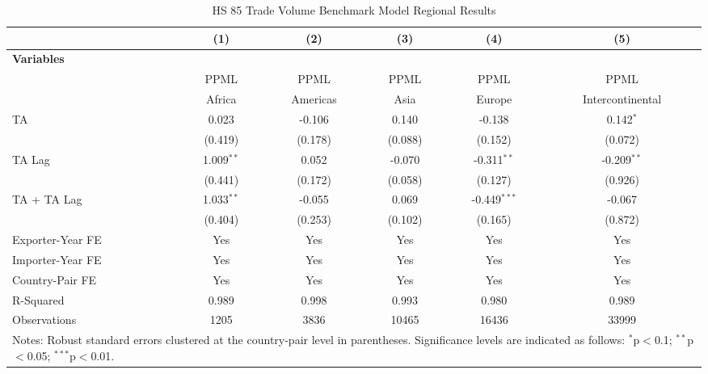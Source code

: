\begin{table}[htbp]
    \centering
    \caption{HS 85 Trade Volume Benchmark Model Regional Results}
    \label{tab:85_trade_benchmark_region_analysis}
    \begin{adjustbox}{max width=\textwidth}
    \begin{tabular}{l@{\extracolsep{1pt}}ccccc}
    \hline
    & \multicolumn{1}{c}{(1)} & \multicolumn{1}{c}{(2)} & \multicolumn{1}{c}{(3)} & \multicolumn{1}{c}{(4)} & \multicolumn{1}{c}{(5)} \\
    \hline
    \textbf{Variables} &  &  &  &  &  \\
    \hline
     & PPML & PPML & PPML & PPML & PPML \\
     & Africa & Americas & Asia & Europe & Intercontinental \\
    \hline
    TA & 0.023 & -0.106 & 0.140 & -0.138 & 0.142$^{\ast}$ \\
    & (0.419) & (0.178) & (0.088) & (0.152) & (0.072) \\

    TA Lag & 1.009$^{\ast\ast}$ & 0.052 & -0.070 & -0.311$^{\ast\ast}$ & -0.209$^{\ast\ast}$ \\
    & (0.441) & (0.172) & (0.058) & (0.127) & (0.926) \\

    TA + TA Lag & 1.033$^{\ast\ast}$ & -0.055 & 0.069 & -0.449$^{\ast\ast\ast}$ & -0.067 \\
    & (0.404) & (0.253) & (0.102) & (0.165) & (0.872) \\
    \hline
    Exporter-Year FE & Yes & Yes & Yes & Yes & Yes \\
    Importer-Year FE & Yes & Yes & Yes & Yes & Yes \\
    Country-Pair FE & Yes & Yes & Yes & Yes & Yes \\
    R-Squared & 0.989 & 0.998 & 0.993 & 0.980 & 0.989 \\
    Observations & 1205 & 3836 & 10465 & 16436 & 33999 \\
    \hline
    \multicolumn{6}{l}{\footnotesize{Notes: Robust standard errors clustered at the country-pair level in parentheses. Significance levels are indicated as follows: $^{\ast}$p$<$0.1; $^{\ast\ast}$p$<$0.05; $^{\ast\ast\ast}$p$<$0.01.}} \\
    \end{tabular}
    \end{adjustbox}
\end{table}
